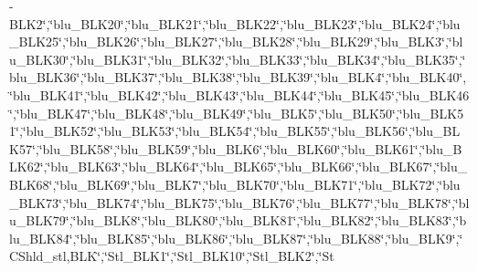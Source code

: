 \begin{DoxyCompactItemize}
-\-B\-L\-K2\char`\"{},\char`\"{}blu\-\_\-\-B\-L\-K20\char`\"{},\char`\"{}blu\-\_\-\-B\-L\-K21\char`\"{},\char`\"{}blu\-\_\-\-B\-L\-K22\char`\"{},\char`\"{}blu\-\_\-\-B\-L\-K23\char`\"{},\char`\"{}blu\-\_\-\-B\-L\-K24\char`\"{},\char`\"{}blu\-\_\-\-B\-L\-K25\char`\"{},\char`\"{}blu\-\_\-\-B\-L\-K26\char`\"{},\char`\"{}blu\-\_\-\-B\-L\-K27\char`\"{},\char`\"{}blu\-\_\-\-B\-L\-K28\char`\"{},\char`\"{}blu\-\_\-\-B\-L\-K29\char`\"{},\char`\"{}blu\-\_\-\-B\-L\-K3\char`\"{},\char`\"{}blu\-\_\-\-B\-L\-K30\char`\"{},\char`\"{}blu\-\_\-\-B\-L\-K31\char`\"{},\char`\"{}blu\-\_\-\-B\-L\-K32\char`\"{},\char`\"{}blu\-\_\-\-B\-L\-K33\char`\"{},\char`\"{}blu\-\_\-\-B\-L\-K34\char`\"{},\char`\"{}blu\-\_\-\-B\-L\-K35\char`\"{},\char`\"{}blu\-\_\-\-B\-L\-K36\char`\"{},\char`\"{}blu\-\_\-\-B\-L\-K37\char`\"{},\char`\"{}blu\-\_\-\-B\-L\-K38\char`\"{},\char`\"{}blu\-\_\-\-B\-L\-K39\char`\"{},\char`\"{}blu\-\_\-\-B\-L\-K4\char`\"{},\char`\"{}blu\-\_\-\-B\-L\-K40\char`\"{},\char`\"{}blu\-\_\-\-B\-L\-K41\char`\"{},\char`\"{}blu\-\_\-\-B\-L\-K42\char`\"{},\char`\"{}blu\-\_\-\-B\-L\-K43\char`\"{},\char`\"{}blu\-\_\-\-B\-L\-K44\char`\"{},\char`\"{}blu\-\_\-\-B\-L\-K45\char`\"{},\char`\"{}blu\-\_\-\-B\-L\-K46\char`\"{},\char`\"{}blu\-\_\-\-B\-L\-K47\char`\"{},\char`\"{}blu\-\_\-\-B\-L\-K48\char`\"{},\char`\"{}blu\-\_\-\-B\-L\-K49\char`\"{},\char`\"{}blu\-\_\-\-B\-L\-K5\char`\"{},\char`\"{}blu\-\_\-\-B\-L\-K50\char`\"{},\char`\"{}blu\-\_\-\-B\-L\-K51\char`\"{},\char`\"{}blu\-\_\-\-B\-L\-K52\char`\"{},\char`\"{}blu\-\_\-\-B\-L\-K53\char`\"{},\char`\"{}blu\-\_\-\-B\-L\-K54\char`\"{},\char`\"{}blu\-\_\-\-B\-L\-K55\char`\"{},\char`\"{}blu\-\_\-\-B\-L\-K56\char`\"{},\char`\"{}blu\-\_\-\-B\-L\-K57\char`\"{},\char`\"{}blu\-\_\-\-B\-L\-K58\char`\"{},\char`\"{}blu\-\_\-\-B\-L\-K59\char`\"{},\char`\"{}blu\-\_\-\-B\-L\-K6\char`\"{},\char`\"{}blu\-\_\-\-B\-L\-K60\char`\"{},\char`\"{}blu\-\_\-\-B\-L\-K61\char`\"{},\char`\"{}blu\-\_\-\-B\-L\-K62\char`\"{},\char`\"{}blu\-\_\-\-B\-L\-K63\char`\"{},\char`\"{}blu\-\_\-\-B\-L\-K64\char`\"{},\char`\"{}blu\-\_\-\-B\-L\-K65\char`\"{},\char`\"{}blu\-\_\-\-B\-L\-K66\char`\"{},\char`\"{}blu\-\_\-\-B\-L\-K67\char`\"{},\char`\"{}blu\-\_\-\-B\-L\-K68\char`\"{},\char`\"{}blu\-\_\-\-B\-L\-K69\char`\"{},\char`\"{}blu\-\_\-\-B\-L\-K7\char`\"{},\char`\"{}blu\-\_\-\-B\-L\-K70\char`\"{},\char`\"{}blu\-\_\-\-B\-L\-K71\char`\"{},\char`\"{}blu\-\_\-\-B\-L\-K72\char`\"{},\char`\"{}blu\-\_\-\-B\-L\-K73\char`\"{},\char`\"{}blu\-\_\-\-B\-L\-K74\char`\"{},\char`\"{}blu\-\_\-\-B\-L\-K75\char`\"{},\char`\"{}blu\-\_\-\-B\-L\-K76\char`\"{},\char`\"{}blu\-\_\-\-B\-L\-K77\char`\"{},\char`\"{}blu\-\_\-\-B\-L\-K78\char`\"{},\char`\"{}blu\-\_\-\-B\-L\-K79\char`\"{},\char`\"{}blu\-\_\-\-B\-L\-K8\char`\"{},\char`\"{}blu\-\_\-\-B\-L\-K80\char`\"{},\char`\"{}blu\-\_\-\-B\-L\-K81\char`\"{},\char`\"{}blu\-\_\-\-B\-L\-K82\char`\"{},\char`\"{}blu\-\_\-\-B\-L\-K83\char`\"{},\char`\"{}blu\-\_\-\-B\-L\-K84\char`\"{},\char`\"{}blu\-\_\-\-B\-L\-K85\char`\"{},\char`\"{}blu\-\_\-\-B\-L\-K86\char`\"{},\char`\"{}blu\-\_\-\-B\-L\-K87\char`\"{},\char`\"{}blu\-\_\-\-B\-L\-K88\char`\"{},\char`\"{}blu\-\_\-\-B\-L\-K9\char`\"{},\char`\"{}C\-Shld\-\_\-stl,B\-L\-K\char`\"{},\char`\"{}Stl\-\_\-\-B\-L\-K1\char`\"{},\char`\"{}Stl\-\_\-\-B\-L\-K10\char`\"{},\char`\"{}Stl\-\_\-\-B\-L\-K2\char`\"{},\char`\"{}St
\end{DoxyCompactItemize}
